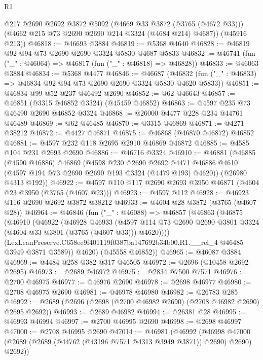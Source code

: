 \begin{lexlean}{R1}
\begin{coremodule}
        @217
        @2690
        @2692
        @3872
        @5092
        (@4669 @33 @3872 (@3765 (@4672 @33)))
        (@4662 @215 @73 @2690 @2690 @214 @3324 (@4684 @214) @4687))
      (@45916 @213))
@46818 := @46693 @3884
@46819 := @5368 @4640
@46828 := @46819 @92 @94 @73 @2690 @2690 @3324 @5830 @4687 @5833
@46832 := @46741 (fun ("_" : @46064) => @46817 (fun ("_" : @46818) => @46828))
@46833 := @46063 @3884
@46834 := @5368 @4477
@46846 := @46687
    (@46832 (fun ("_" : @46833) => @46834 @92 @94 @73 @2690 @2690 @3324 @5830 @4620 @5833))
@46851 := @46834 @99 @52 @237 @46492 @2690
@46852 := @62 @46643
@46857 := @46851 (@3315 @46852 @3324) (@45459 @46852)
@46863 := @4597 @235 @73 @46490 @2690 @46852 @3324
@46868 := @26000 @4477 @228 @234 @44761 @46489
@46869 := @62 @46485
@46870 := @3315 @46869
@46871 := @4271 @38212
@46872 := @4427 @46871
@46875 := @46868 (@46870 @46872) @46852
@46881 := @4597 @232 @118 @2695 @2910 @46869 @46872
@46885 := @4585 @104 @231 @2693 @2690
@46886 := @46716 @3324
@46910 := @46881
    (@46885
      (@4590 @46886)
      @46869
      (@4598
        @230
        @2690
        @2692
        @4471
        @46886
        @4610
        (@4597 @194 @73 @2690 @2690 @193 @3324 (@4479 @193) @4620))
      (@26980 @4313 @192))
@46922 := @4597 @110 @117 @2690 @2693 @3950 @46871 (@4604 @23 @3950 (@3765 (@4607 @23)))
@46923 := @4597 @112
@46928 := @46923 @116 @2690 @2692 @3872 @38212
@46933 := @4604 @28 @3872 (@3765 (@4607 @28))
@46964 := @46846
    (fun ("_" : @46088) =>
    @46857
      (@46863
        (@46875
          (@46910
            (@46922
              (@46928
                @46933
                (@4597
                  @114
                  @73
                  @2690
                  @2690
                  @3801
                  @3324
                  (@4604 @33 @3801 (@3765 (@4607 @33)))
                  @4620))))
          (LexLeanPreserve.C658ee9f401119f0387ba147692b34b00.R1.__rel_4 @46485 @3949 @3871 @3589))
        @4620)
      (@45558 @46852))
@46965 := @46087 @3884
@46969 := @4484 @258 @382 @317 @46505
@46972 := @2696 (@10458 @2692 @2695)
@46973 := @2689 @46972
@46975 := @2834 @7500 @7571
@46976 := @2700 @46975
@46977 := @46976 @2690
@46978 := @2698 @46977
@46980 := @2708 @46975 @2690
@46981 := @46978 @46980
@46982 := @26783 @285
@46992 := @2689 (@2696 (@2698 (@2700 @46982 @2690) (@2708 @46982 @2690) @2695 @2692))
@46993 := @2689 @46982
@46994 := @26381 @28
@46995 := @46993 @46994
@46997 := @2700 @46995 @2690
@46998 := @2698 @46997
@47000 := @2708 @46995 @2690
@47014 := @46981
    (@46992
      (@46998 @47000 (@2689 (@2689 (@44762 (@43196 @7571 @4313 @3949 @3871)) @2690) @2690) @2692))

\end{coremodule}
\end{lexlean}
